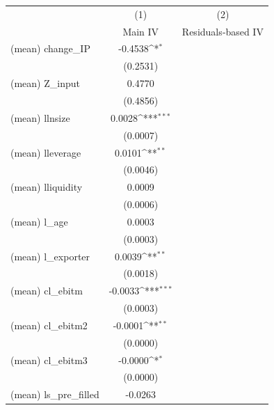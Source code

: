 {
\def\sym#1{\ifmmode^{#1}\else\(^{#1}\)\fi}
\begin{tabular}{l*{2}{c}}
\toprule
                    &\multicolumn{1}{c}{(1)}&\multicolumn{1}{c}{(2)}\\
                    &\multicolumn{1}{c}{Main IV}&\multicolumn{1}{c}{Residuals‑based IV}\\
\midrule
(mean) change\_IP    &     -0.4538\sym{*}  &                     \\
                    &    (0.2531)         &                     \\
(mean) Z\_input      &      0.4770         &                     \\
                    &    (0.4856)         &                     \\
(mean) llnsize      &      0.0028\sym{***}&                     \\
                    &    (0.0007)         &                     \\
(mean) lleverage    &      0.0101\sym{**} &                     \\
                    &    (0.0046)         &                     \\
(mean) lliquidity   &      0.0009         &                     \\
                    &    (0.0006)         &                     \\
(mean) l\_age        &      0.0003         &                     \\
                    &    (0.0003)         &                     \\
(mean) l\_exporter   &      0.0039\sym{**} &                     \\
                    &    (0.0018)         &                     \\
(mean) cl\_ebitm     &     -0.0033\sym{***}&                     \\
                    &    (0.0003)         &                     \\
(mean) cl\_ebitm2    &     -0.0001\sym{**} &                     \\
                    &    (0.0000)         &                     \\
(mean) cl\_ebitm3    &     -0.0000\sym{*}  &                     \\
                    &    (0.0000)         &                     \\
(mean) ls\_pre\_filled&     -0.0263         &                     \\

\end{tabular}}
